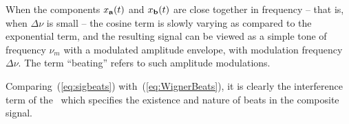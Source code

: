 When the components $x_{\mathbf{a}}(t)$ and $x_{\mathbf{b}}(t)$ are close together in
frequency -- that is, when $\Delta\nu$ is small -- the cosine term is
slowly varying as compared to the exponential term, and the resulting
signal can be viewed as a simple tone of frequency $\nu_m$ with
a modulated amplitude envelope, with modulation frequency $\Delta\nu$.
The term ``beating'' refers to such
amplitude modulations. %

Comparing~(\ref{eq:sigbeats}) with~(\ref{eq:WignerBeats}), it is
clearly the interference term of the \WT\ which specifies
the existence and nature of beats in the composite signal.

